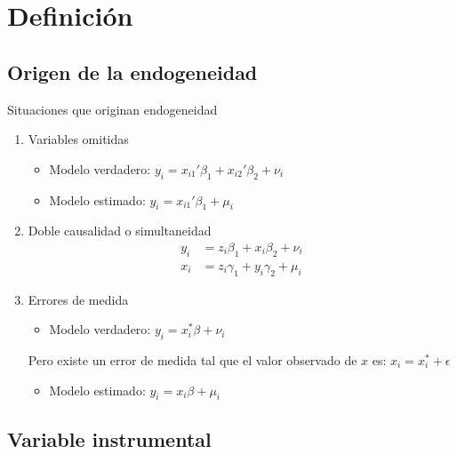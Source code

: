 \section{Definición}

\subsection{Origen de la endogeneidad}

\begin{frame}{Situaciones que originan endogeneidad}
	\begin{enumerate}
		\item Variables omitidas
			\begin{itemize}
				\item Modelo verdadero: $y_i=x_{i1}'\beta_1+x_{i2}'\beta_2+\nu_i$
				\item Modelo estimado: $y_i=x_{i1}'\beta_1+\mu_i$
			\end{itemize}
		\item Doble causalidad o simultaneidad
			\begin{align*}
				y_i &= z_{i}\beta_1+x_{i}\beta_2+\nu_{i} \\
				x_i &= z_{i}\gamma_1+y_{i}\gamma_2+\mu_{i}
			\end{align*}
		\item Errores de medida
				\begin{itemize}
					\item Modelo verdadero: $y_i=x_{i}^*\beta+\nu_i$
				\end{itemize}
			  Pero existe un error de medida tal que el valor observado de $x$ es: $x_i = x_i^*+\epsilon$
				\begin{itemize}
					\item Modelo estimado: $y_i=x_{i}\beta+\mu_i$
				\end{itemize}
	\end{enumerate}
\end{frame}

\subsection{Variable instrumental}

